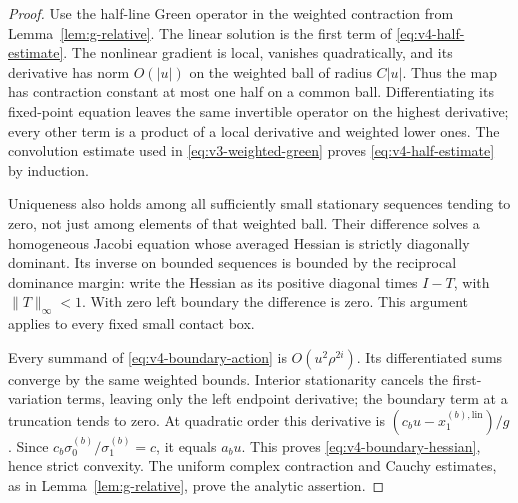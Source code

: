 \begin{proof}
Use the half-line Green operator in the weighted contraction from
Lemma~\ref{lem:g-relative}. The linear solution is the first term of
\eqref{eq:v4-half-estimate}. The nonlinear gradient is local, vanishes
quadratically, and its derivative has norm $O(|u|)$ on the weighted
ball of radius $C|u|$. Thus the map has contraction constant at most
one half on a common ball. Differentiating its fixed-point equation
leaves the same invertible operator on the highest derivative; every
other term is a product of a local derivative and weighted lower
ones. The convolution estimate used in \eqref{eq:v3-weighted-green}
proves \eqref{eq:v4-half-estimate} by induction.

Uniqueness also holds among all sufficiently small stationary sequences
tending to zero, not just among elements of that weighted ball. Their
difference solves a homogeneous Jacobi equation whose averaged Hessian
is strictly diagonally dominant. Its inverse on bounded sequences is
bounded by the reciprocal dominance margin: write the Hessian as its
positive diagonal times $I-T$, with $\|T\|_\infty<1$.
With zero left boundary the difference is zero. This argument applies
to every fixed small contact box.

Every summand of \eqref{eq:v4-boundary-action} is $O(u^2\rho^{2i})$.
Its differentiated sums converge by the same weighted bounds. Interior
stationarity cancels the first-variation terms, leaving only the left
endpoint derivative; the boundary term at a truncation tends to zero.
At quadratic order this derivative is
$(c_bu-x_1^{(b),\mathrm{lin}})/g$. Since
$c_b\sigma_0^{(b)}/\sigma_1^{(b)}=c$, it equals $a_bu$.
This proves \eqref{eq:v4-boundary-hessian}, hence strict convexity.
The uniform complex contraction and Cauchy estimates, as in
Lemma~\ref{lem:g-relative}, prove the analytic assertion.
\end{proof}

